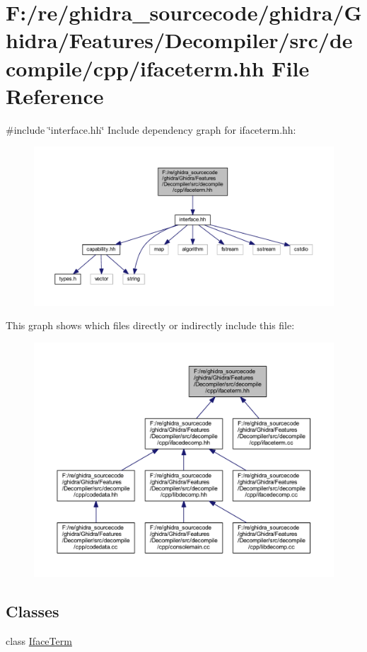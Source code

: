 \hypertarget{ifaceterm_8hh}{}\section{F\+:/re/ghidra\+\_\+sourcecode/ghidra/\+Ghidra/\+Features/\+Decompiler/src/decompile/cpp/ifaceterm.hh File Reference}
\label{ifaceterm_8hh}
{\ttfamily \#include \char`\"{}interface.\+hh\char`\"{}}\newline
Include dependency graph for ifaceterm.\+hh\+:
\nopagebreak
\begin{figure}[H]
\begin{center}
\leavevmode
\includegraphics[width=350pt]{ifaceterm_8hh__incl}
\end{center}
\end{figure}
This graph shows which files directly or indirectly include this file\+:
\nopagebreak
\begin{figure}[H]
\begin{center}
\leavevmode
\includegraphics[width=350pt]{ifaceterm_8hh__dep__incl}
\end{center}
\end{figure}
\subsection*{Classes}
\begin{DoxyCompactItemize}
\item 
class \mbox{\hyperlink{class_iface_term}{Iface\+Term}}
\end{DoxyCompactItemize}
